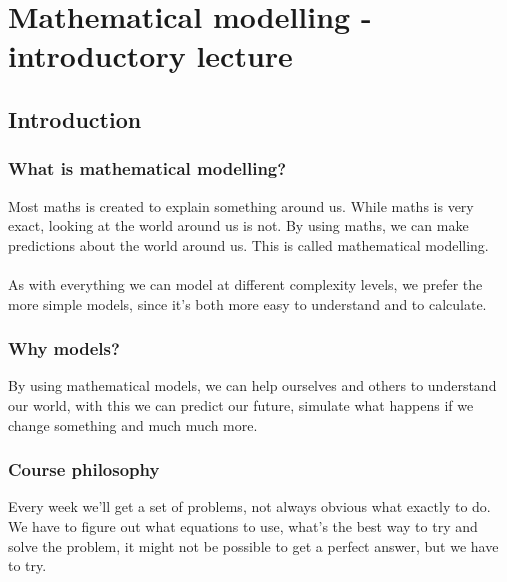 \chapter{Mathematical modelling - introductory lecture}

\section{Introduction}
\subsection{What is mathematical modelling?}
Most maths is created to explain something around us.
While maths is very exact, looking at the world around us is not. By using maths, we can make predictions about the world around us. This is called mathematical modelling.\\
\\
As with everything we can model at different complexity levels, we prefer the more simple models, since it's both more easy to understand and to calculate.\\

\subsection{Why models?}
By using mathematical models, we can help ourselves and others to understand our world, with this we can predict our future, simulate what happens if we change something and much much more.\\

\subsection{Course philosophy}
Every week we'll get a set of problems, not always obvious what exactly to do. We have to figure out what equations to use, what's the best way to try and solve the problem, it might not be possible to get a perfect answer, but we have to try.

